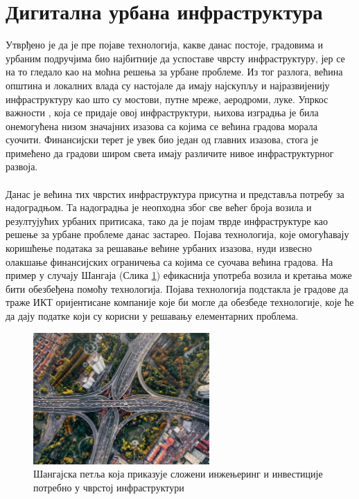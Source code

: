 \documentclass{article}
\begin{document}
\section{Дигитална урбана инфраструктура}
Утврђено је да је пре појаве технологија, какве данас постоје, градовима и урбаним подручјима био најбитније да успоставе чврсту инфраструктуру, јер се на то гледало као на моћна решења за урбане проблеме. Из тог разлога, већина општина и локалних влада су настојале да имају најскупљу и најразвијенију инфраструктуру као што су мостови, путне мреже, аеродроми, луке. Упркос важности , која се придаје овој инфраструктури, њихова изградња је била онемогућена низом значајних изазова са којима се већина градова морала суочити. Финансијски терет је увек био један од главних изазова, стога је примећено да градови широм света имају различите нивое инфраструктурног развоја. 
\\\\
Данас је већина тих чврстих инфраструктура присутна и представља потребу за надоградњом. Та надоградња је неопходна због све већег броја возила и резултујућих урбаних притисака, тако да је појам тврде инфраструктуре као решење за урбане проблеме данас застарео. Појава технологија, које омогућавају коришћење података за решавање већине урбаних изазова, нуди извесно олакшање финансијских ограничења са којима се суочава већина градова. На пример у случају Шангаја (Слика \ref{fig:sangaj}) ефикаснија употреба возила и кретања може бити обезбеђена помоћу технологија. Појава технологија подстакла је градове да траже ИКТ оријентисане компаније које би могле да обезбеде технологије, које ће да дају податке који су корисни у решавању елементарних проблема. \\
\begin{figure}[h!]
\centering
\includegraphics[width=0.6\textwidth]{slike/sangajska_petlja.png}
\caption{\label{fig:sangaj}Шангајска петља која приказује сложени инжењеринг и инвестиције
потребно у чврстој инфраструктури}
\end{figure} 
\end{document}
